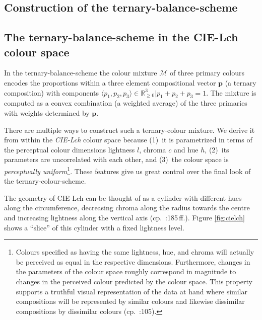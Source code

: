 \documentclass[parskip=half]{scrartcl}
\begin{document}
\begin{appendix}

\section{Construction of the ternary-balance-scheme} %
\label{sec:app-tbs}

\subsection{The ternary-balance-scheme in the CIE-Lch colour space} %
\label{ssec:app-cie}

In the ternary-balance-scheme the colour mixture $\mathscr{M}$ of three primary colours encodes the proportions within a three element compositional vector $\textbf{p}$ (a ternary composition) with components $\langle p_1, p_2, p_3 \rangle \in \mathbb{R}_{\geq 0}^{3} | p_1+p_2+p_3 = 1.$ The mixture is computed as a convex combination (a weighted average) of the three primaries with weights determined by $\textbf{p}$.

There are multiple ways to construct such a ternary-colour mixture. We derive it from within the \emph{CIE-Lch} colour space because
  (1)~it is parametrized in terms of the perceptual colour dimensions lightness $l$, chroma $c$ and hue $h$,
  (2)~its parameters are uncorrelated with each other, and
  (3)~the colour space is \emph{perceptually uniform}\footnote{
  Colours specified as having the same lightness, hue, and chroma will actually be perceived as equal in the respective dimensions. Furthermore, changes in the parameters of the colour space roughly correspond in magnitude to changes in the perceived colour predicted by the colour space. This property supports a truthful visual representation of the data at hand where similar compositions will be represented by similar colours and likewise dissimilar compositions by dissimilar colours (cp.~\cite{Ware2013}:105).
}.
These features give us great control over the final look of the ternary-colour-scheme.

The geometry of CIE-Lch can be thought of as a cylinder with different hues along the circumference, decreasing chroma along the radius towards the centre and increasing lightness along the vertical axis (cp.~\cite{Fairchild2005}:185\,ff.). Figure \ref{fig:cielch} shows a \enquote{slice} of this cylinder with a fixed lightness level.


\end{appendix}
\end{document}

